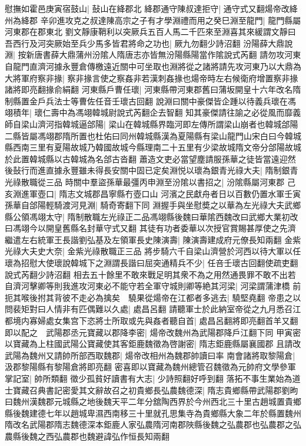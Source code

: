 慰撫如霍邑庚寅宿鼓山|{
	鼔山在絳郡北}
絳郡通守陳叔達拒守|{
	通守式又翻煬帝改絳州為絳郡}
辛卯進攻克之叔達陳高宗之子有才學淵禮而用之癸巳淵至龍門|{
	龍門縣屬河東郡在郡東北}
劉文靜康鞘利以突厥兵五百人馬二千匹來至淵喜其來緩謂文靜曰吾西行及河突厥始至兵少馬多皆君將命之功也|{
	厥九勿翻少詩沼翻}
汾陽薛大鼎說淵|{
	按新唐書薛大鼎蒲州汾隂人隋唐志亦皆無汾陽縣陽當作隂說式芮翻}
請勿攻河東自龍門直濟河據永豐倉傳檄遠近關中可坐取也淵將從之諸將請先攻河東乃以大鼎為大將軍府察非掾|{
	察非掾言使之察姦非若漢刺姦掾也煬帝時左右候衛府增置察非掾諸將即亮翻掾俞絹翻}
河東縣戶曹任瓌|{
	河東縣帶河東郡舊曰蒲坂開皇十六年改名隋制縣置金戶兵法士等曹佐任音壬瓌古回翻}
說淵曰關中豪傑皆企踵以待義兵瓌在馮翊積年|{
	瓌仁壽中為馮翊韓城尉說式芮翻企去智翻}
知其豪傑請往諭之必從風而靡義師自梁山濟河指韓城逼郃陽|{
	梁山在韓城縣界臨河即左傳所謂梁山崩者也韓城郃陽二縣皆屬馮翊郡隋所置也杜佑曰同州韓城縣漢為夏陽縣有梁山龍門山宋白曰今韓城縣西南三里有夏陽故城乃韓國故城今縣理南二十五里有少梁故城隋文帝分郃陽故城於此置韓城縣以古韓城為名郃古沓翻}
蕭造文吏必當望塵請服孫華之徒皆當遠迎然後鼔行而進直據永豐雖未得長安關中固已定矣淵悦以瓌為銀青光祿大夫|{
	隋制銀青光祿散職從三品}
時關中羣盜孫華最彊丙申淵至汾隂以書招之|{
	汾隂縣屬河東郡}
己亥淵進軍壺口|{
	隋志文城郡昌寧縣冇壺口山}
河濱之民獻舟者日以百數仍置水軍壬寅孫華自郃陽輕騎渡河見淵|{
	騎奇寄翻下同}
淵握手與坐慰奬之以華為左光祿大夫武鄉縣公領馮翊太守|{
	隋制散職左光祿正二品馮翊縣後魏曰華隂西魏改曰武鄉大業初改曰馮翊今以開皇舊縣名封華守式又翻}
其徒有功者委華以次授官賞賜甚厚使之先濟繼遣左右統軍王長諧劉弘基及左領軍長史陳演壽|{
	陳演壽建成府元僚長知兩翻}
金紫光祿大夫史大奈|{
	金紫光祿散職正三品}
將步騎六千自梁山濟營於河西以待大軍以任瓌為招慰大使瓌說韓城下之淵謂長諧曰屈突通精兵不少|{
	任咅壬瓌古回翻使疏吏翻說式芮翻少詩沼翻}
相去五十餘里不敢來戰足明其衆不為之用然通畏罪不敢不出若自濟河擊卿等則我進攻河東必不能守若全軍守城則卿等絶其河梁|{
	河梁謂蒲津橋}
前扼其喉後拊其背彼不走必為擒矣　驍果從煬帝在江都者多逃去|{
	驍堅堯翻}
帝患之以問裴矩對曰人情非有匹偶難以久處|{
	處昌呂翻}
請聽軍士於此納室帝從之九月悉召江都境内寡婦處女集宫下恣將士所取或先與姦者聽自首|{
	處昌呂翻將即亮翻首羊又翻}
即以配之　武陽郡丞元寶藏以郡降李密|{
	煬帝改魏州為武陽郡降戶江翻下同}
甲寅密以寶藏為上柱國武陽公寶藏使其客鉅鹿魏徵為啓謝密|{
	隋志鉅鹿縣屬襄國郡}
且請改武陽為魏州又請帥所部西取魏郡|{
	煬帝改相州為魏郡帥讀曰率}
南會諸將取黎陽倉|{
	汲郡黎陽縣有黎陽倉將即亮翻}
密喜即以寶藏為魏州總管召魏徵為元帥府文學參軍掌記室|{
	帥所類翻}
徵少孤貧好讀書有大志|{
	少詩照翻好呼到翻}
落拓不事生業始為道士寶藏召典書記密愛其文辭故召之初貴鄉長弘農魏德深|{
	隋志貴鄉縣帶武陽郡劉昫曰魏州漢魏郡元城縣之地後魏天平二年分舘陶西界於今州西北三十里古趙城置貴鄉縣後魏建德七年以趙城卑濕西南移三十里就孔思集寺為貴鄉縣大象二年於縣置魏州隋改名武陽郡隋志魏德深本鉅鹿人家弘農隋河南郡陜縣後魏之弘農郡也弘農郡之弘農縣後魏之西弘農郡也魏避諱弘作恒長知兩翻}
